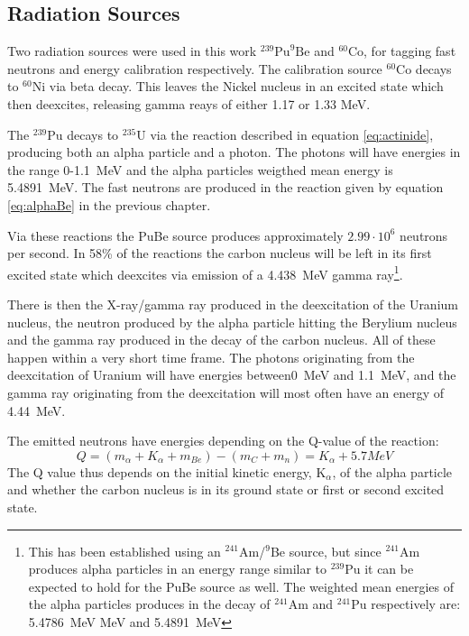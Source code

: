 \documentclass[main.tex]{subfiles}
\begin{document}
\subsection{Radiation Sources}
Two radiation sources were used in this work $^\text{239}\text{Pu}^\text{9}\text{Be}$ and $^\text{60}\text{Co}$, for tagging fast neutrons and energy calibration respectively. The calibration source $^\text{60}\text{Co}$ decays to $^\text{60}\text{Ni}$ via beta decay. This leaves the Nickel nucleus in an excited state which then deexcites, releasing gamma reays of either 1.17 or 1.33 MeV\cite{Nudat}.


The $^\textrm{239}$Pu decays to $^\textrm{235}$U via the reaction described in equation \ref{eq:actinide}, producing both an alpha particle and a photon. The photons will have energies in the range 0-\SI{1.1}{\MeV}\cite{Nudat} and the alpha particles weigthed mean energy is \SI{5.4891}{\mega\eV}\cite{Scherzinger:2017}. The fast neutrons are produced in the reaction given by equation \ref{eq:alphaBe} in the previous chapter.

Via these reactions the PuBe source produces approximately $\text{2.99}\cdot\text{10}^\text{6}$ neutrons per second\cite{Scherzinger:2017}. In 58\% of the reactions the carbon nucleus will be left in its first excited state which deexcites via emission of a \SI{4.438}{\mega\eV} gamma ray\cite{Scherzinger:2015}\footnote{This has been established using an $^\text{241}$Am/$^\text{9}$Be source, but since $^\text{241}$Am produces alpha particles in an energy range similar to $^\text{239}$Pu it can be expected to hold for the PuBe source as well. The weighted mean energies of the alpha particles produces in the decay of $^\text{241}$Am and $^\text{241}$Pu respectively are: \SI{5.4786}{\mega\eV} MeV and \SI{5.4891}{\mega\eV}\cite{Scherzinger:2017}}.

There is then the X-ray/gamma ray produced in the deexcitation of the Uranium nucleus, the neutron produced by the alpha particle hitting the Berylium nucleus and the gamma ray produced in the decay of the carbon nucleus. All of these happen within a very short time frame. The photons originating from the deexcitation of Uranium will have energies between\SI{0}{\MeV} and \SI{1.1}{\MeV}, and the gamma ray originating from the deexcitation will most often have an energy of \SI{4.44}{MeV}.

The emitted neutrons have energies depending on the Q-value of the reaction:
$$Q = (m_\alpha + K_\alpha + m_{Be}) - (m_{C} + m_n) = K_\alpha + 5.7 MeV$$
The Q value thus depends on the initial kinetic energy, K$_\alpha$, of the alpha particle and whether the carbon nucleus is in its ground state or first or second excited state. 
\end{document}
